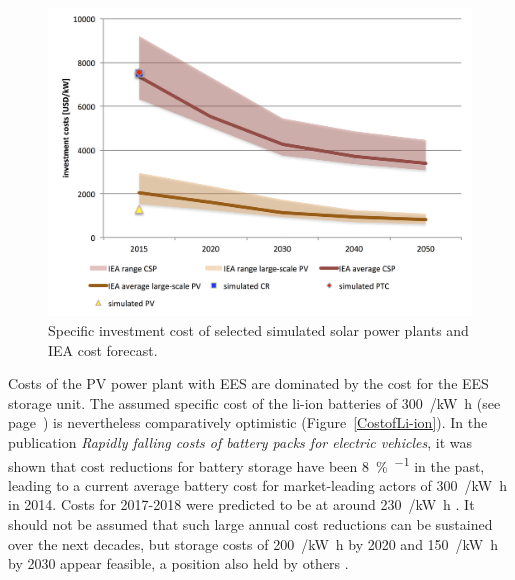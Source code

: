 \begin{figure}[htbp]  
\centering
\includegraphics[width=1\linewidth]{FIG/investmentcost}
\caption{Specific investment cost of selected simulated solar power plants and IEA cost forecast.}\label{investmentcost}
\end{figure}

Costs of the \ac{PV} power plant with \ac{EES} are dominated by the cost for the \ac{EES} storage unit. The assumed specific cost of the \ac{li-ion} batteries of \SI{300}{\usd/\kilo\watt\hour} (see page~\pageref{SUBSUBPVFinancialparameter}) is nevertheless comparatively optimistic (Figure~\ref{CostofLi-ion}). In the publication \emph{Rapidly falling costs of battery packs for electric vehicles}, it was shown that cost reductions for battery storage have been \SI{8}{\percent\per\year} in the past, leading to a current average battery cost for market-leading actors of \SI{300}{\usd/\kilo\watt\hour} in 2014. Costs for 2017-2018 were predicted to be at around \SI{230}{\usd/\kilo\watt\hour} \cite{Nykvist2015}. It should not be assumed that such large annual cost reductions can be sustained over the next decades, but storage costs of \SI{200}{\usd/\kilo\watt\hour} by 2020 and \SI{150}{\usd/\kilo\watt\hour} by 2030 appear feasible, a position also held by others \cite{MckinseyQuaterly2012}.

